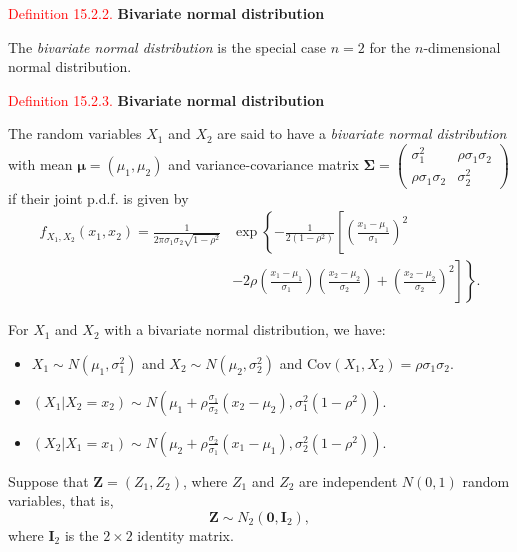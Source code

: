 \documentclass[
]{book}
\begin{document}
\leavevmode{}%
\textcolor{red}{Definition 15.2.2.}
{\textbf{Bivariate normal distribution}}

The \emph{bivariate normal distribution} is the special case \(n=2\) for the \(n\)-dimensional normal distribution.

\leavevmode{}%
\textcolor{red}{Definition 15.2.3.}
{\textbf{Bivariate normal distribution}}

The random variables \(X_1\) and \(X_2\) are said to have a \emph{bivariate normal distribution} with mean \(\mathbf{\mu} = (\mu_1,\mu_2)\) and variance-covariance matrix \(\mathbf{\Sigma} = \begin{pmatrix} \sigma_1^2 & \rho \sigma_1 \sigma_2 \\ \rho \sigma_1 \sigma_2 & \sigma_2^2 \end{pmatrix}\) if their joint p.d.f. is given by
\begin{align*}
f_{X_1,X_2}(x_1,x_2) = \frac{1}{2\pi\sigma_1\sigma_2\sqrt{1-\rho^2}} &\exp \left\{ -\frac{1}{2(1-\rho^2)} \left[ \left( \frac{x_1-\mu_1}{\sigma_1} \right)^2 \right. \right. \\
& \left. \left. -2\rho \left( \frac{x_1-\mu_1}{\sigma_1} \right) \left( \frac{x_2-\mu_2}{\sigma_2} \right) + \left( \frac{x_2-\mu_2}{\sigma_2} \right)^2 \right] \right\}.
\end{align*}

For \(X_1\) and \(X_2\) with a bivariate normal distribution, we have:

\begin{itemize}
\item
  \(X_1 \sim N(\mu_1, \sigma_1^2)\) and \(X_2 \sim N(\mu_2, \sigma_2^2)\) and \(\text{Cov}(X_1,X_2) = \rho \sigma_1 \sigma_2\).
\item
  \((X_1 | X_2 = x_2) \sim N \left( \mu_1 + \rho \frac{\sigma_1}{\sigma_2} (x_2-\mu_2), \sigma_1^2 (1-\rho^2) \right)\).
\item
  \((X_2 | X_1 = x_1) \sim N \left( \mu_2 + \rho \frac{\sigma_2}{\sigma_1} (x_1-\mu_1), \sigma_2^2 (1-\rho^2) \right)\).
\end{itemize}

Suppose that \(\mathbf{Z} =(Z_1,Z_2)\), where \(Z_1\) and \(Z_2\) are independent \(N(0,1)\) random variables, that is,
\[\mathbf{Z} \sim N_2 ( \mathbf{0}, \mathbf{I}_2),\]
where \(\mathbf{I}_2\) is the \(2 \times 2\) identity matrix.
\end{document}
